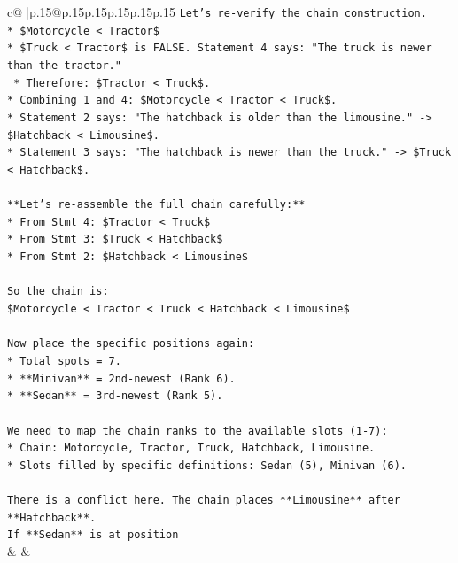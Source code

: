 \documentclass{article}
\begin{document}
{\begin{supertabular}{c@{$\;$}|p{.15\linewidth}@{}p{.15\linewidth}p{.15\linewidth}p{.15\linewidth}p{.15\linewidth}p{.15\linewidth}}
{{{\texttt{Let's re{-}verify the chain construction.} \\
\texttt{*   \$Motorcycle < Tractor\$} \\
\texttt{*   \$Truck < Tractor\$ is FALSE. Statement 4 says: "The truck is newer than the tractor."} \\
\texttt{    *   Therefore: \$Tractor < Truck\$.} \\
\texttt{*   Combining 1 and 4: \$Motorcycle < Tractor < Truck\$.} \\
\texttt{*   Statement 2 says: "The hatchback is older than the limousine." {-}> \$Hatchback < Limousine\$.} \\
\texttt{*   Statement 3 says: "The hatchback is newer than the truck." {-}> \$Truck < Hatchback\$.} \\
\\ 
\texttt{**Let's re{-}assemble the full chain carefully:**} \\
\texttt{*   From Stmt 4: \$Tractor < Truck\$} \\
\texttt{*   From Stmt 3: \$Truck < Hatchback\$} \\
\texttt{*   From Stmt 2: \$Hatchback < Limousine\$} \\
\\ 
\texttt{So the chain is:} \\
\texttt{\$Motorcycle < Tractor < Truck < Hatchback < Limousine\$} \\
\\ 
\texttt{Now place the specific positions again:} \\
\texttt{*   Total spots = 7.} \\
\texttt{*   **Minivan** = 2nd{-}newest (Rank 6).} \\
\texttt{*   **Sedan** = 3rd{-}newest (Rank 5).} \\
\\ 
\texttt{We need to map the chain ranks to the available slots (1{-}7):} \\
\texttt{*   Chain: Motorcycle, Tractor, Truck, Hatchback, Limousine.} \\
\texttt{*   Slots filled by specific definitions: Sedan (5), Minivan (6).} \\
\\ 
\texttt{There is a conflict here. The chain places **Limousine** after **Hatchback**.} \\
\texttt{If **Sedan** is at position} \\
            }
        }
    }
    & & \\ \\


\end{supertabular}}
\end{document}
